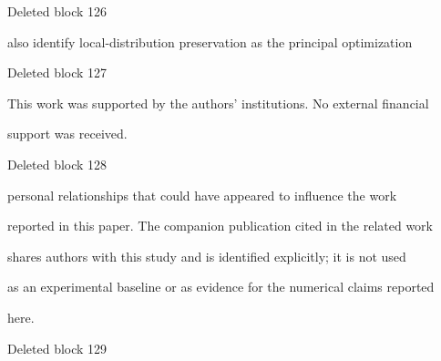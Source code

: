\documentclass[a4paper,fleqn]{cas-dc}
\newenvironment{RevisionDeletion}{%
  \par\begingroup\color{revisionred}\footnotesize\ttfamily
  \setlength{\parindent}{0pt}\setlength{\parskip}{1pt}\obeyspaces
}{\par\endgroup}
\begin{document}
\begin{RevisionDeletion}
Deleted block 126\par
also identify local-distribution preservation as the principal optimization\par
\end{RevisionDeletion}

\begin{RevisionDeletion}
Deleted block 127\par
This work was supported by the authors' institutions. No external financial\par
support was received.\par
\end{RevisionDeletion}

\begin{RevisionDeletion}
Deleted block 128\par
personal relationships that could have appeared to influence the work\par
reported in this paper. The companion publication cited in the related work\par
shares authors with this study and is identified explicitly; it is not used\par
as an experimental baseline or as evidence for the numerical claims reported\par
here.\par
\end{RevisionDeletion}

\begin{RevisionDeletion}
Deleted block 129\par
\par
\end{RevisionDeletion}



\end{document}
